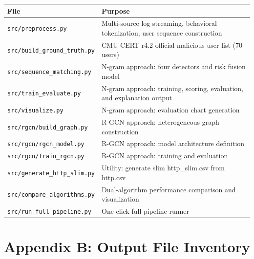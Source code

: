 \documentclass[
  a4paper,
  11pt]{article}
\newcounter{none} %
\begin{document}
{\def\LTcaptype{none} %
\begin{longtable}[]{@{}L{0.28}L{0.66}@{}}
\toprule\noalign{}
File & Purpose \\
\midrule\noalign{}
\endhead
\bottomrule\noalign{}
\endlastfoot
\texttt{src/preprocess.py} & Multi-source log streaming, behavioral
tokenization, user sequence construction \\
\texttt{src/build\_ground\_truth.py} & CMU-CERT r4.2 official malicious
user list (70 users) \\
\texttt{src/sequence\_matching.py} & N-gram approach: four detectors and
risk fusion model \\
\texttt{src/train\_evaluate.py} & N-gram approach: training, scoring,
evaluation, and explanation output \\
\texttt{src/visualize.py} & N-gram approach: evaluation chart
generation \\
\texttt{src/rgcn/build\_graph.py} & R-GCN approach: heterogeneous graph
construction \\
\texttt{src/rgcn/rgcn\_model.py} & R-GCN approach: model architecture
definition \\
\texttt{src/rgcn/train\_rgcn.py} & R-GCN approach: training and
evaluation \\
\texttt{src/generate\_http\_slim.py} & Utility: generate slim
http\_slim.csv from http.csv \\
\texttt{src/compare\_algorithms.py} & Dual-algorithm performance
comparison and visualization \\
\texttt{src/run\_full\_pipeline.py} & One-click full pipeline runner \\
\end{longtable}
}

\section{Appendix B: Output File
Inventory}\label{appendix-b-output-file-inventory}
\end{document}
